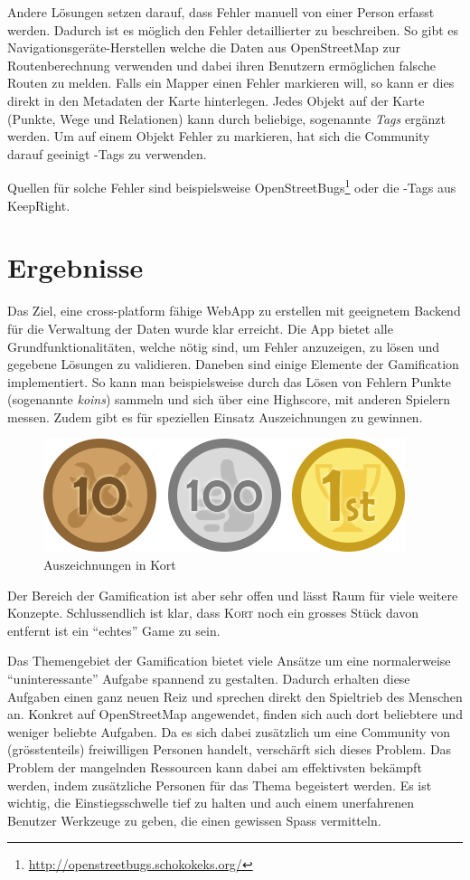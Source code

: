 Andere Lösungen setzen darauf, dass Fehler manuell von einer Person erfasst werden. Dadurch ist es möglich den Fehler detaillierter zu beschreiben. 
So gibt es Navigationsgeräte-Herstellen welche die Daten aus \gls{OpenStreetMap} zur Routenberechnung verwenden und dabei ihren Benutzern ermöglichen falsche Routen zu melden.
Falls ein \gls{Mapper} einen Fehler markieren will, so kann er dies direkt in den Metadaten der Karte hinterlegen. Jedes Objekt auf der Karte (Punkte, Wege und Relationen) kann durch beliebige, sogenannte  \emph{Tags} ergänzt werden.
Um auf einem Objekt Fehler zu markieren, hat sich die Community darauf geeinigt -Tags zu verwenden.

Quellen für solche Fehler sind beispielsweise OpenStreetBugs\footnote{\url{http://openstreetbugs.schokokeks.org/}} oder die -Tags aus KeepRight.

\section*{Ergebnisse}
Das Ziel, eine cross-platform fähige \gls{WebApp} zu erstellen mit geeignetem Backend für die Verwaltung der Daten wurde klar erreicht.
Die App bietet alle Grundfunktionalitäten, welche nötig sind, um Fehler anzuzeigen, zu lösen und gegebene Lösungen zu validieren.
Daneben sind einige Elemente der Gamification implementiert. So kann man beispielsweise durch das Lösen von Fehlern Punkte (sogenannte \emph{koins}) sammeln und sich über eine Highscore, mit anderen Spielern messen.
Zudem gibt es für speziellen Einsatz Auszeichnungen zu gewinnen.

\begin{figure}[H]
	\centering
	\includegraphics[scale=0.6]{images/gamification/gamification-badges}
	\caption{Auszeichnungen in Kort}
	\label{image-kort-badges}
\end{figure}

Der Bereich der Gamification ist aber sehr offen und lässt Raum für viele weitere Konzepte. Schlussendlich ist klar, dass \textsc{Kort} noch ein grosses Stück davon entfernt ist ein "`echtes"' Game zu sein.

Das Themengebiet der Gamification bietet viele Ansätze um eine normalerweise "`uninteressante"' Aufgabe spannend zu gestalten.
Dadurch erhalten diese Aufgaben einen ganz neuen Reiz und sprechen direkt den Spieltrieb des Menschen an.
Konkret auf \gls{OpenStreetMap} angewendet, finden sich auch dort beliebtere und weniger beliebte Aufgaben.
Da es sich dabei zusätzlich um eine Community von (grösstenteils) freiwilligen Personen handelt, verschärft sich dieses Problem.
Das Problem der mangelnden Ressourcen kann dabei am effektivsten bekämpft werden, indem zusätzliche Personen für das Thema begeistert werden.
Es ist wichtig, die Einstiegsschwelle tief zu halten und auch einem unerfahrenen Benutzer Werkzeuge zu geben, die einen gewissen Spass vermitteln.

